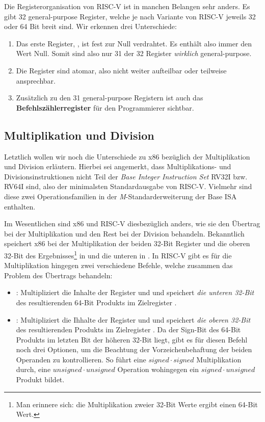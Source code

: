 Die Registerorganisation von RISC-V ist in manchen Belangen sehr anders. Es gibt
32 general-purpose Register, welche je nach Variante von RISC-V jeweils 32 oder
64 Bit breit sind. Wir erkennen drei Unterschiede:

\begin{enumerate}
  \item Das erste Register, , ist fest zur Null verdrahtet. Es enthält
    also immer den Wert Null. Somit sind also nur 31 der 32 Register
    \emph{wirklich} general-purpose.
  \item Die Register sind atomar, also nicht weiter aufteilbar oder teilweise
    ansprechbar.
  \item Zusätzlich zu den 31 general-purpose Registern ist auch das
    \textbf{Befehlszählerregister}  für den Programmierer sichtbar.
\end{enumerate}

\subsection{Multiplikation und Division}

Letztlich wollen wir noch die Unterschiede zu x86 bezüglich der Multiplikation
und Division erläutern. Hierbei sei angemerkt, dass Multiplikations- und
Divisionsinstruktionen nicht Teil der \emph{Base Integer Instruction Set} RV32I
bzw. RV64I sind, also der minimalsten Standardausgabe von RISC-V. Vielmehr sind
diese zwei Operationsfamilien in der \emph{M}-Standarderweiterung der Base ISA
enthalten.

Im Wesentlichen sind x86 und RISC-V diesbezüglich anders, wie sie den Übertrag bei
der Multiplikation und den Rest bei der Division behandeln. Bekanntlich
speichert x86 bei der Multiplikation der beiden 32-Bit Register  und
 die oberen 32-Bit des Ergebnisses\footnote{Man erinnere sich: die
  Multiplikation zweier 32-Bit Werte ergibt einen 64-Bit Wert.} in 
und die unteren in . In RISC-V gibt es für die Multiplikation hingegen
zwei verschiedene Befehle, welche zusammen das Problem des Übertrags behandeln:

\begin{itemize}
  \item {}: Multipliziert die Inhalte der Register
     und  und speichert \emph{die unteren 32-Bit} des
    resultierenden 64-Bit Produkts im Zielregister .
  \item {}: Multipliziert die Ihhalte der Register
     und  und speichert \emph{die oberen 32-Bit} des
    resultierenden Produkts im Zielregister . Da der Sign-Bit des
    64-Bit Produkts im letzten Bit der höheren 32-Bit liegt, gibt es für diesen
    Befehl noch drei Optionen, um die Beachtung der Vorzeichenbehaftung der
    beiden Operanden zu kontrollieren. So führt  eine
    $signed \cdot signed$ Multiplikation durch, 
    eine $unsigned \cdot unsigned$ Operation wohingegen
     ein $signed \cdot unsigned$ Produkt bildet.
\end{itemize}

